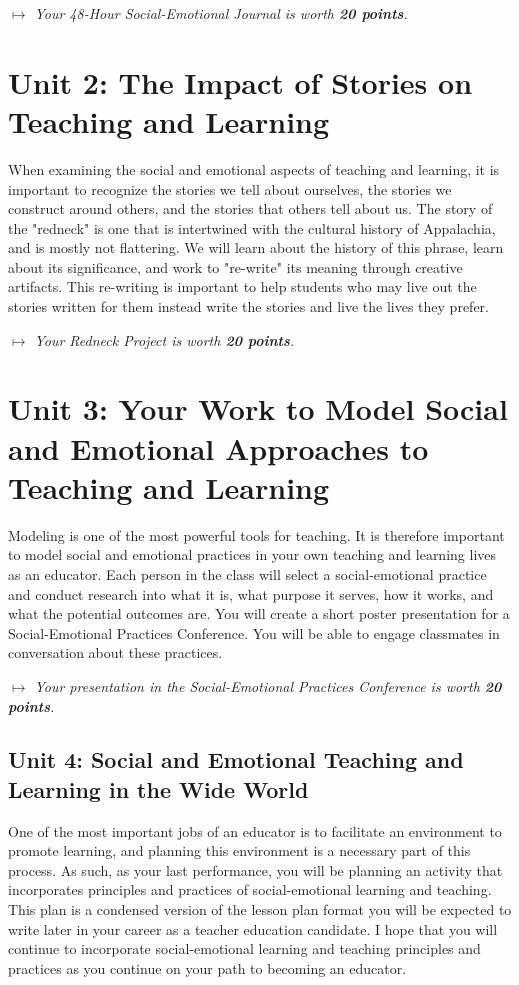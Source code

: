 \documentclass[two-side]{tufte-handout}
\begin{document}
\medskip\noindent\textit{$\mapsto$ Your 48-Hour Social-Emotional Journal is worth \textbf{20 points}.}

\section{Unit 2: The Impact of Stories on Teaching and Learning}

When examining the social and emotional aspects of teaching and learning, it is important to recognize the stories we tell about ourselves, the stories we construct around others, and the stories that others tell about us. The story of the "redneck" is one that is intertwined with the cultural history of Appalachia, and is mostly not flattering. We will learn about the history of this phrase, learn about its significance, and work to "re-write" its meaning through creative artifacts. This re-writing is important to help students who may live out the stories written for them instead write the stories and live the lives they prefer.

\medskip\noindent\textit{$\mapsto$ Your Redneck Project is worth \textbf{20 points}.}

\section{Unit 3: Your Work to Model Social and Emotional Approaches to Teaching and Learning}

Modeling is one of the most powerful tools for teaching. It is therefore important to model social and emotional practices in your own teaching and learning lives as an educator. Each person in the class will select a social-emotional practice and conduct research into what it is, what purpose it serves, how it works, and what the potential outcomes are. You will create a short poster presentation for a Social-Emotional Practices Conference. You will be able to engage classmates in conversation about these practices.

\medskip\noindent\textit{$\mapsto$ Your presentation in the Social-Emotional Practices Conference is worth \textbf{20 points}.}

\subsection{Unit 4: Social and Emotional Teaching and Learning in the Wide World}

One of the most important jobs of an educator is to facilitate an environment to promote learning, and planning this environment is a necessary part of this process. As such, as your last performance, you will be planning an activity that incorporates principles and practices of social-emotional learning and teaching. This plan is a condensed version of the lesson plan format you will be expected to write later in your career as a teacher education candidate. I hope that you will continue to incorporate social-emotional learning and teaching principles and practices as you continue on your path to becoming an educator.
\end{document}
